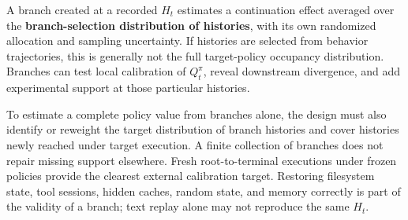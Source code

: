 A branch created at a recorded \(H_t\) estimates a continuation effect averaged over the \textbf{branch-selection distribution of histories}, with its own randomized allocation and sampling uncertainty. If histories are selected from behavior trajectories, this is generally not the full target-policy occupancy distribution. Branches can test local calibration of \(Q_t^{\pi}\), reveal downstream divergence, and add experimental support at those particular histories.

To estimate a complete policy value from branches alone, the design must also identify or reweight the target distribution of branch histories and cover histories newly reached under target execution. A finite collection of branches does not repair missing support elsewhere. Fresh root-to-terminal executions under frozen policies provide the clearest external calibration target. Restoring filesystem state, tool sessions, hidden caches, random state, and memory correctly is part of the validity of a branch; text replay alone may not reproduce the same \(H_t\).
